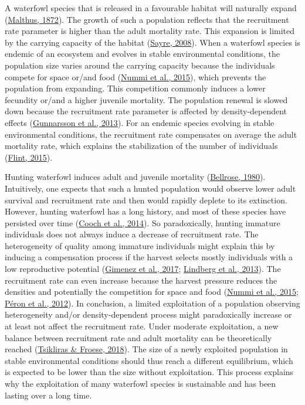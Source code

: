 \documentclass[
  english,
]{article}
\begin{document}
A waterfowl species that is released in a favourable habitat will naturally expand (\protect\hyperlink{ref-Malthus1872}{Malthus, 1872}). The growth of such a population reflects that the recruitment rate parameter is higher than the adult mortality rate. This expansion is limited by the carrying capacity of the habitat (\protect\hyperlink{ref-Sayre2008}{Sayre, 2008}). When a waterfowl species is endemic of an ecosystem and evolves in stable environmental conditions, the population size varies around the carrying capacity because the individuals compete for space or/and food (\protect\hyperlink{ref-Nummi2015}{Nummi et al., 2015}), which prevents the population from expanding. This competition commonly induces a lower fecundity or/and a higher juvenile mortality. The population renewal is slowed down because the recruitment rate parameter is affected by density-dependent effects (\protect\hyperlink{ref-Gunnarsson2013}{Gunnarsson et al., 2013}). For an endemic species evolving in stable environmental conditions, the recruitment rate compensates on average the adult mortality rate, which explains the stabilization of the number of individuals (\protect\hyperlink{ref-Flint2015}{Flint, 2015}).

Hunting waterfowl induces adult and juvenile mortality (\protect\hyperlink{ref-Bellrose1980}{Bellrose, 1980}). Intuitively, one expects that such a hunted population would observe lower adult survival and recruitment rate and then would rapidly deplete to its extinction. However, hunting waterfowl has a long history, and most of these species have persisted over time (\protect\hyperlink{ref-Cooch2014}{Cooch et al., 2014}). So paradoxically, hunting immature individuals does not always induce a decrease of recruitment rate. The heterogeneity of quality among immature individuals might explain this by inducing a compensation process if the harvest selects mostly individuals with a low reproductive potential (\protect\hyperlink{ref-Gimenez2017}{Gimenez et al., 2017}; \protect\hyperlink{ref-Lindberg2013}{Lindberg et al., 2013}). The recruitment rate can even increase because the harvest pressure reduces the densities and potentially the competition for space and food (\protect\hyperlink{ref-Nummi2015}{Nummi et al., 2015}; \protect\hyperlink{ref-Peron2012}{Péron et al., 2012}). In conclusion, a limited exploitation of a population observing heterogeneity and/or density-dependent process might paradoxically increase or at least not affect the recruitment rate. Under moderate exploitation, a new balance between recruitment rate and adult mortality can be theoretically reached (\protect\hyperlink{ref-Tsikliras2018}{Tsikliras \& Froese, 2018}). The size of a newly exploited population in stable environmental conditions should thus reach a different equilibrium, which is expected to be lower than the size without exploitation. This process explains why the exploitation of many waterfowl species is sustainable and has been lasting over a long time.
\end{document}
